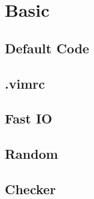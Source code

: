 \documentclass[a4paper,10pt,oneside]{article}
\begin{document}
\setlength\parindent{0pt}
\setlength\columnseprule{0.5pt}
\footnotesize


\pagestyle{fancy}
\fancyfoot{}
\fancyhead[R]{\thepage}

\twocolumn

\setlength{\columnseprule}{0pt}
{
\scriptsize
\begin{multicols}{2}
\tableofcontents
\end{multicols}
}
\setlength{\columnseprule}{0.5pt}

\section{Basic}

\subsection{Default Code}


\subsection{.vimrc}


%

%

\subsection{Fast IO}


\subsection{Random}


\subsection{Checker}

\end{document}
